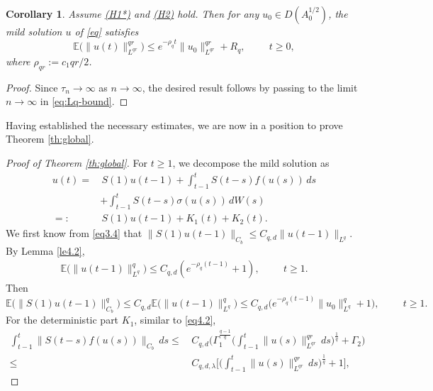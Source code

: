 \documentclass[10pt]{article}
\numberwithin{figure}{section}
\numberwithin{equation}{section}
\newtheorem{corollary}[theorem]{Corollary}
\newcommand{\0}{{\theta}}
\def\be{\begin{equation}}
\def\ee{\end{equation}}
\def\bc{\begin{corollary}}
\def\ec{\end{corollary}}
\def\E{\mathbb{E}}
\def\Hs{\hspace{1cm}}\def\hs{\hspace{0.5cm}}
\begin{document}
\vs
\bc Assume \hyperref[H1*]{(H1*)} and \hyperref[H2]{(H2)} hold. Then for any $u_0 \in D(A_0^{1/2})$, the mild solution $u$ of \eqref{eq} satisfies\begin{equation*}\label{eq4.15}
\mathbb{E}\big(\|u(t)\|_{L^{qr}}^{qr}\big)
\le e^{-\rho_qt}\|u_0\|_{L^{qr}}^{qr}
+R_q,\Hs t\ge0,
\end{equation*} where $\rho_{qr}:=c_1 qr/2$.\ec
\begin{proof} Since $\tau_n\to\infty$ as $n\to\infty$, the desired result follows by passing to the limit $n\to\infty$ in \eqref{eq:Lq-bound}.\end{proof}


Having established the necessary estimates, we are now in a position to prove Theorem \ref{th:global}.
\begin{proof}[Proof of Theorem \ref{th:global}]  For $t \ge 1$, we decompose the mild solution as
\begin{equation*}
\begin{split}
u(t) =&\, S(1) u(t-1) + \int_{t-1}^t S(t-s) f(u(s)) \, ds \\
      &+ \int_{t-1}^t S(t-s) \sigma(u(s)) \, dW(s) \\
=:&\,S(1) u(t-1)+ K_1(t) + K_2(t).
\end{split}
\end{equation*}
We first know from \eqref{eq3.4}
 that $\| S(1) u(t-1) \|_{C_b} \le C_{q,d} \| u(t-1) \|_{L^q}$. By Lemma \ref{le4.2}, 
\begin{equation*}
\begin{split}
\mathbb{E}\big(\| u(t-1) \|_{L^q}^q\big)\le C_{q,d}(e^{-\rho_q(t-1)}+1), \Hs t \ge 1.
\end{split}\end{equation*}
Then \be\label{eq4.3}\E\big(\|S(1) u(t-1) \|_{C_b}^q\big) \le C_{q,d} \mathbb{E}\big(\|u(t-1)\|_{L^q}^q\big)\le C_{q,d}\big(e^{-\rho_q(t-1)}\| u_0 \|_{L^q}^q + 1 \big), \Hs t \ge 1.\ee
\vs
For the deterministic part $K_1$, similar to \eqref{eq4.2},
\begin{equation}\label{eq4.12}\begin{split}
      \int_{t-1}^{t } \big\|S(t  - s) f(u(s)) \big\|_{C_b} \, ds 
\le&\, C_{q,d}\Big( \Gamma_1^{\frac{q-1}{q}}
        \Big( \int_{t-1}^t  \| u(s) \|_{L^{qr}}^{qr} \, ds \Big)^{\frac{1}{q}} + \Gamma_2 \Big)\\
\le&\, C_{q,d,\lambda} \Big[ \Big( \int_{t-1}^t  \| u(s) \|_{L^{qr}}^{qr} \, ds \Big)^{\frac{1}{q}} + 1 \Big],\end{split}
\end{equation}

\end{proof}
\end{document}
